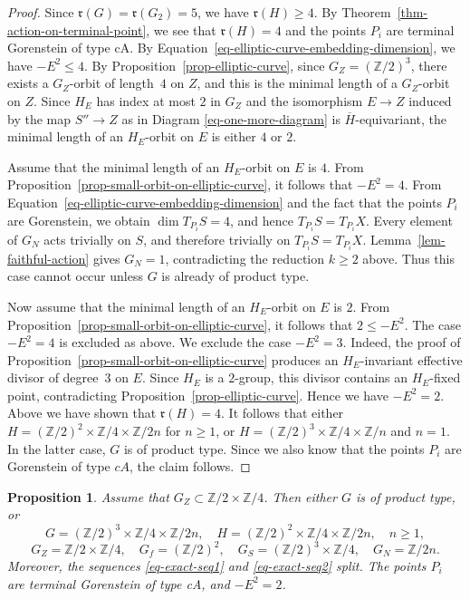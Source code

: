 \documentclass[11pt]{amsart}
\numberwithin{equation}{section}
\newtheorem{proposition}[thm]{Proposition}
\theoremstyle{definition}
\theoremstyle{remark}
\begin{document}
\begin{proof}
Since $\mathfrak{r}(G)=\mathfrak{r}(G_2)= 5$, we have $\mathfrak{r}(H)\geq 4$. 
By Theorem~\ref{thm-action-on-terminal-point}, we see that $\mathfrak{r}(H)=4$ and the points $P_i$ are terminal Gorenstein of type cA. By Equation~\eqref{eq-elliptic-curve-embedding-dimension}, we have $-E^2\leq 4$.  
By Proposition~\ref{prop-elliptic-curve}, since $G_Z=(\mathbb{Z}/2)^3$, there exists a $G_Z$-orbit of length~$4$ on $Z$, and this is the minimal length of a $G_Z$-orbit on $Z$. 
Since $H_E$ has index at most $2$ in $G_Z$ and the isomorphism $E\to Z$ induced by the map $S''\to Z$ as in Diagram \eqref{eq-one-more-diagram} is $\overline H$-equivariant, the minimal length of an $H_E$-orbit on $E$ is either $4$ or $2$. 

Assume that the minimal length of an $H_E$-orbit on $E$ is $4$. 
From Proposition~\ref{prop-small-orbit-on-elliptic-curve}, it follows that $-E^2=4$.
From Equation~\eqref{eq-elliptic-curve-embedding-dimension} and the fact that the points $P_i$ are Gorenstein, we obtain $\dim T_{P_i}S=4$, and hence $T_{P_i}S=T_{P_i}X$. Every element of $G_N$ acts trivially on $S$, and therefore trivially on $T_{P_i}S=T_{P_i}X$. Lemma~\ref{lem-faithful-action} gives $G_N=1$, contradicting the reduction $k\geq2$ above. Thus this case cannot occur unless $G$ is already of product type.
 
Now assume that the minimal length of an $H_E$-orbit on $E$ is $2$.
From Proposition~\ref{prop-small-orbit-on-elliptic-curve}, it follows that $2\leq -E^2$. 
The case $-E^2=4$ is excluded as above. 
We exclude the case $-E^2=3$. Indeed, the proof of Proposition~\ref{prop-small-orbit-on-elliptic-curve} produces an $H_E$-invariant effective divisor of degree~$3$ on $E$. Since $H_E$ is a $2$-group, this divisor contains an $H_E$-fixed point, contradicting Proposition~\ref{prop-elliptic-curve}. Hence we have $-E^2=2$. 
Above we have shown that $\mathfrak{r}(H)=4$. It follows that either $H=(\mathbb{Z}/2)^2\times \mathbb{Z}/4\times \mathbb{Z}/2n$ for $n\geq 1$, or $H=(\mathbb{Z}/2)^3\times \mathbb{Z}/4\times \mathbb{Z}/n$ and $n=1$. In the latter case, $G$ is of product type. 
Since we also know that the points $P_i$ are Gorenstein of type $cA$, the claim follows.  
\end{proof}

\begin{proposition}
\label{prop-E2-2}
Assume that $G_Z\subset\mathbb{Z}/2\times\mathbb{Z}/4$. Then either $G$ is of product type, or
\begin{equation}
G=(\mathbb{Z}/2)^3\times \mathbb{Z}/4 \times \mathbb{Z}/2n, \quad H=(\mathbb{Z}/2)^2\times \mathbb{Z}/4\times \mathbb{Z}/2n,   \quad n\geq 1, 
\end{equation}
\[
G_Z=\mathbb{Z}/2\times \mathbb{Z}/4,  \quad G_f=(\mathbb{Z}/2)^2,  \quad G_S = (\mathbb{Z}/2)^3\times \mathbb{Z}/4, \quad G_N = \mathbb{Z}/2n. 
\]
Moreover, the sequences \eqref{eq-exact-seq1} and  \eqref{eq-exact-seq2} split.  
The points $P_i$ are terminal Gorenstein of type cA, and $-E^2=2$. 
\end{proposition}
\end{document}
